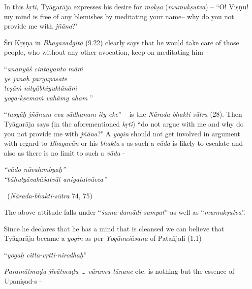 In this \textit{kṛti,} Tyāgarāja expresses his desire for \textit{mokṣa} (\textit{mumukṣutva}) – ``O! Viṣṇu! my mind is free of any blemishes by meditating your name– why do you not provide me with \textit{jñāna}?"

Śrī Kṛṣṇa in \textit{Bhagavadgītā} (9.22) clearly says that he would take care of those people, who without any other avocation, keep on meditating him –

\begin{centerquote}
“\textit{ananyāś cintayanto māṁ}\\ \textit{ye janāḥ paryupāsate }\\ \textit{teṣāṁ nityābhiyuktānāṁ}\\ \textit{yoga-kṣemaṁ vahāmy aham} ”
\end{centerquote}

“\textit{tasyāḥ jñānam eva sādhanam ity eke}” – is the \textit{Nārada-bhakti-sūtra} (28). Then Tyāgarāja says (in the aforementioned \textit{kṛti}) ``do not argue with me and why do you not provide me with \textit{jñāna}?" A \textit{yogin} should not get involved in argument with regard to \textit{Bhagavān} or his \textit{bhakta}-s as such a \textit{vāda} is likely to escalate and also as there is no limit to such a \textit{vāda} -

\begin{centerquote}
\textit{“vādo nāvalambyaḥ”}\\ \textit{“bāhulyāvakāśatvāt aniyatatvācca”} 

~\hfill (\textit{Nārada-bhakti-sūtra} 74, 75)
\end{centerquote}

The above attitude falls under “\textit{śama-damādi-sampat}” as well as “\textit{mumukṣutva}”.

Since he declares that he has a mind that is cleansed we can believe that Tyāgarāja became a \textit{yogin} as per \textit{Yogānuśāsana} of Patañjali (1.1) -

\begin{myquote}
“\textit{yogaḥ citta-vṛtti-nirodhaḥ}”
\end{myquote}

\textit{Paramātmuḍu jīvātmuḍu … vāramu tānane} etc. is nothing but the essence of Upaniṣad-s -

